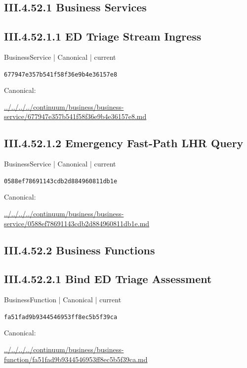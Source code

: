 \documentclass[10pt,a4paper]{article}
\begin{document}
\subsection*{III.4.52.1 Business Services}
\subsection*{III.4.52.1.1 ED Triage Stream Ingress}
{\small BusinessService | Canonical | current}\par
\texttt{677947e357b541f58f36e9b4e36157e8}\par
Canonical: \par
{\footnotesize\url{../../../../continuum/business/business-service/677947e357b541f58f36e9b4e36157e8.md}}\par
\subsection*{III.4.52.1.2 Emergency Fast-Path LHR Query}
{\small BusinessService | Canonical | current}\par
\texttt{0588ef78691143cdb2d884960811db1e}\par
Canonical: \par
{\footnotesize\url{../../../../continuum/business/business-service/0588ef78691143cdb2d884960811db1e.md}}\par
\subsection*{III.4.52.2 Business Functions}
\subsection*{III.4.52.2.1 Bind ED Triage Assessment}
{\small BusinessFunction | Canonical | current}\par
\texttt{fa51fad9b9344546953ff8ec5b5f39ca}\par
Canonical: \par
{\footnotesize\url{../../../../continuum/business/business-function/fa51fad9b9344546953ff8ec5b5f39ca.md}}\par
\end{document}
